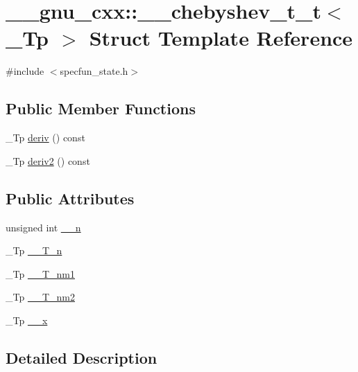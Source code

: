 \hypertarget{struct____gnu__cxx_1_1____chebyshev__t__t}{}\section{\+\_\+\+\_\+gnu\+\_\+cxx\+:\+:\+\_\+\+\_\+chebyshev\+\_\+t\+\_\+t$<$ \+\_\+\+Tp $>$ Struct Template Reference}
\label{struct____gnu__cxx_1_1____chebyshev__t__t}


{\ttfamily \#include $<$specfun\+\_\+state.\+h$>$}

\subsection*{Public Member Functions}
\begin{DoxyCompactItemize}
\item 
\+\_\+\+Tp \hyperlink{struct____gnu__cxx_1_1____chebyshev__t__t_a56cbd3597ee48e612b596c9982d23e79}{deriv} () const
\item 
\+\_\+\+Tp \hyperlink{struct____gnu__cxx_1_1____chebyshev__t__t_a7b8086b8c304f7cca7cd971c7be8c2c5}{deriv2} () const
\end{DoxyCompactItemize}
\subsection*{Public Attributes}
\begin{DoxyCompactItemize}
\item 
unsigned int \hyperlink{struct____gnu__cxx_1_1____chebyshev__t__t_ac02fe9fb6e68f0c1817a3922fd88bc5e}{\+\_\+\+\_\+n}
\item 
\+\_\+\+Tp \hyperlink{struct____gnu__cxx_1_1____chebyshev__t__t_adf551a5a058f9f5ab962e1d4b9e22f12}{\+\_\+\+\_\+\+T\+\_\+n}
\item 
\+\_\+\+Tp \hyperlink{struct____gnu__cxx_1_1____chebyshev__t__t_a5bd9de811f5d2decba40b560092d39f3}{\+\_\+\+\_\+\+T\+\_\+nm1}
\item 
\+\_\+\+Tp \hyperlink{struct____gnu__cxx_1_1____chebyshev__t__t_a3528c96b44c3734eed8570189644c0a1}{\+\_\+\+\_\+\+T\+\_\+nm2}
\item 
\+\_\+\+Tp \hyperlink{struct____gnu__cxx_1_1____chebyshev__t__t_adc03ac0a37e1d895bd74330772146eb7}{\+\_\+\+\_\+x}
\end{DoxyCompactItemize}


\subsection{Detailed Description}
